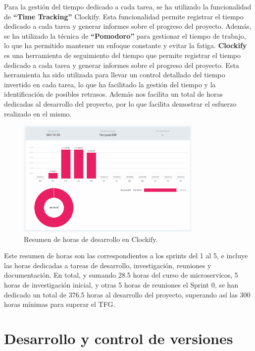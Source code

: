 Para la gestión del tiempo dedicado a cada tarea, se ha utilizado la funcionalidad de \textbf{``Time Tracking''} Clockify. Esta funcionalidad permite registrar el tiempo dedicado a cada tarea y generar informes sobre el progreso del proyecto. Además, se ha utilizado la técnica de \textbf{``Pomodoro''} para gestionar el tiempo de trabajo, lo que ha permitido mantener un enfoque constante y evitar la fatiga.
\newline\newline
\textbf{Clockify}\cite{clockify} es una herramienta de seguimiento del tiempo que permite registrar el tiempo dedicado a cada tarea y generar informes sobre el progreso del proyecto. Esta herramienta ha sido utilizada para llevar un control detallado del tiempo invertido en cada tarea, lo que ha facilitado la gestión del tiempo y la identificación de posibles retrasos.
Además nos facilita un total de horas dedicadas al desarrollo del proyecto, por lo que facilita demostrar el esfuerzo realizado en el mismo.

\begin{figure}[H] 
    \centering 
    \includegraphics[width=0.8\textwidth]{figures/05_clockify.png}
    \caption{Resumen de horas de desarrollo en Clockify.} %
    \label{clockify} %
\end{figure}

Este resumen de horas son las correspondientes a los sprints del 1 al 5, e incluye las horas dedicadas a tareas de desarrollo, investigación, reuniones y documentación. En total, y sumando 28.5 horas del curso de microservicos, 5 horas de investigación inicial, y otras 5 horas de reuniones el Sprint 0, se han dedicado un total de 376.5 horas al desarrollo del proyecto, superando así las 300 horas mínimas para superar el TFG.

\section{Desarrollo y control de versiones}

